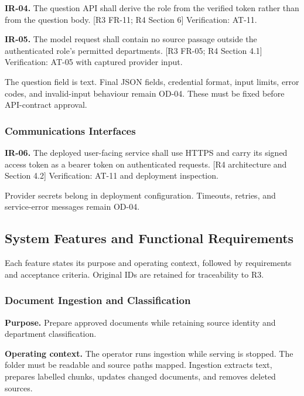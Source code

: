 \documentclass[11pt,letterpaper]{article}
\begin{document}
\endgroup

\textbf{IR-04.} The question API shall derive the role from the verified token rather than from the question body. [R3 FR-11; R4 Section 6] Verification: AT-11.\par

\textbf{IR-05.} The model request shall contain no source passage outside the authenticated role's permitted departments. [R3 FR-05; R4 Section 4.1] Verification: AT-05 with captured provider input.\par

The question field is text. Final JSON fields, credential format, input limits, error codes, and invalid-input behaviour remain OD-04. These must be fixed before API-contract approval.\par

\subsubsection{Communications Interfaces}

\textbf{IR-06.} The deployed user-facing service shall use HTTPS and carry its signed access token as a bearer token on authenticated requests. [R4 architecture and Section 4.2] Verification: AT-11 and deployment inspection.\par

Provider secrets belong in deployment configuration. Timeouts, retries, and service-error messages remain OD-04.\par

\subsection{System Features and Functional Requirements}

Each feature states its purpose and operating context, followed by requirements and acceptance criteria. Original IDs are retained for traceability to R3.\par

\subsubsection{Document Ingestion and Classification}

\textbf{Purpose.} Prepare approved documents while retaining source identity and department classification.\par

\textbf{Operating context.} The operator runs ingestion while serving is stopped. The folder must be readable and source paths mapped. Ingestion extracts text, prepares labelled chunks, updates changed documents, and removes deleted sources.\par
\end{document}
